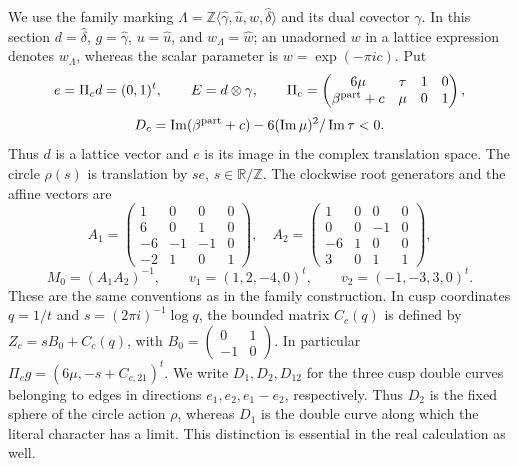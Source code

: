 We use the family marking
$\Lambda=\mathbb Z\langle\widehat\gamma,\widehat u,\widehat w,
\widehat\delta\rangle$ and its dual covector $\gamma$.
In this section $d=\widehat\delta$, $g=\widehat\gamma$,
$u=\widehat u$, and $w_{\Lambda}=\widehat w$; an unadorned $w$ in a
lattice expression denotes $w_{\Lambda}$, whereas the scalar parameter is
$w=\exp(-\pi i c)$. Put
\[
 e=\Pi_c d=(0,1)^t,\qquad E=d\otimes\gamma,
 \qquad \Pi_c=
 \begin{pmatrix}6\mu&\tau&1&0\\\beta^{\rm part}+c&\mu&0&1\end{pmatrix},
\]
\[
 D_c=\operatorname{Im}(\beta^{\rm part}+c)
       -6(\operatorname{Im}\mu)^2/\operatorname{Im}\tau<0.
\]
Thus $d$ is a lattice vector and $e$ is its image in the complex translation
space. The circle $\rho(s)$ is translation by $se$, $s\in\mathbb R/\mathbb Z$.
The clockwise root generators and the affine vectors are
\[
 A_1=\begin{pmatrix}1&0&0&0\\6&0&1&0\\-6&-1&-1&0\\-2&1&0&1\end{pmatrix},\quad
 A_2=\begin{pmatrix}1&0&0&0\\0&0&-1&0\\-6&1&0&0\\3&0&1&1\end{pmatrix},
\]
\[
 M_0=(A_1A_2)^{-1},\qquad
 v_1=(1,2,-4,0)^t,\qquad v_2=(-1,-3,3,0)^t.
\]
These are the same conventions as in the family construction. In cusp
coordinates $q=1/t$ and $s=(2\pi i)^{-1}\log q$, the bounded matrix $C_c(q)$
is defined by $Z_c=sB_0+C_c(q)$, with
$B_0=\left(\begin{smallmatrix}0&1\\-1&0\end{smallmatrix}\right)$.
In particular $\Pi_cg=(6\mu,-s+C_{c,21})^t$.
We write $D_1,D_2,D_{12}$ for the three cusp double curves belonging to
edges in directions $e_1,e_2,e_1-e_2$, respectively. Thus $D_2$ is the
fixed sphere of the circle action $\rho$, whereas $D_1$ is the double
curve along which the literal character has a limit. This distinction
is essential in the real calculation as well.

